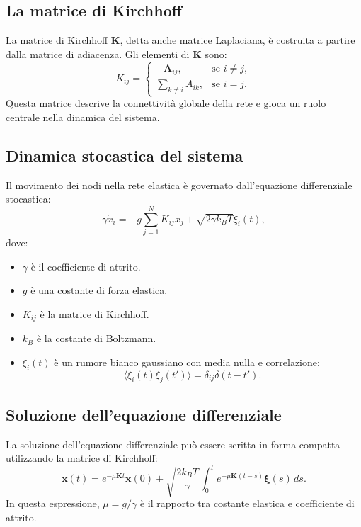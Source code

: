 \documentclass[Lau,binding=0.6cm,oneside,noexaminfo]{sapthesis}
\begin{document}
\subsection{La matrice di Kirchhoff}
La matrice di Kirchhoff $\mathbf{K}$, detta anche matrice Laplaciana, è costruita a partire dalla matrice di adiacenza. Gli elementi di $\mathbf{K}$ sono:
\begin{equation}
K_{ij} =
\begin{cases}
-\mathbf{A}_{ij}, & \text{se } i \neq j, \\
\sum_{k \neq i} A_{ik}, & \text{se } i = j.
\end{cases}
\end{equation}
Questa matrice descrive la connettività globale della rete e gioca un ruolo centrale nella dinamica del sistema.

\subsection{Dinamica stocastica del sistema}
Il movimento dei nodi nella rete elastica è governato dall’equazione differenziale stocastica:
\begin{equation}
\gamma \dot{x}_i = -g \sum_{j=1}^N K_{ij} x_j + \sqrt{2 \gamma k_B T} \xi_i(t),
\end{equation}
dove:
\begin{itemize}
    \item $\gamma$ è il coefficiente di attrito.
    \item $g$ è una costante di forza elastica.
    \item $K_{ij}$ è la matrice di Kirchhoff.
    \item $k_B$ è la costante di Boltzmann.
    \item $\xi_i(t)$ è un rumore bianco gaussiano con media nulla e correlazione:
    \begin{equation}
    \langle \xi_i(t) \xi_j(t') \rangle = \delta_{ij} \delta(t-t').
    \end{equation}
\end{itemize}

\subsection{Soluzione dell’equazione differenziale}
La soluzione dell’equazione differenziale può essere scritta in forma compatta utilizzando la matrice di Kirchhoff:
\begin{equation}
\mathbf{x}(t) = e^{-\mu \mathbf{K} t} \mathbf{x}(0) + \sqrt{\frac{2k_B T}{\gamma}} \int_0^t e^{-\mu \mathbf{K} (t-s)} \boldsymbol{\xi}(s) \, ds.
\end{equation}
In questa espressione, $\mu = g/\gamma$ è il rapporto tra costante elastica e coefficiente di attrito.
\end{document}
